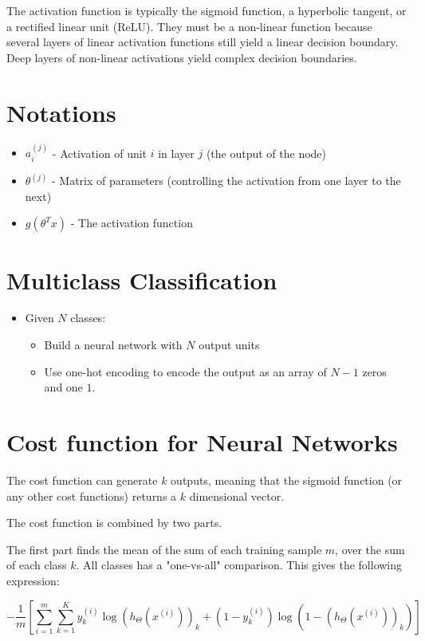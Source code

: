 The activation function is typically the sigmoid function, a hyperbolic tangent, 
or a rectified linear unit (ReLU). They must be a non-linear function because
several layers of linear activation functions still yield a linear decision 
boundary. Deep layers of non-linear activations yield complex decision
boundaries.

\section{Notations}
\begin{itemize}
    \item $a_i^{(j)}$ - Activation of unit $i$ in layer $j$ (the output of the node)
    \item $\theta^{(j)}$ - Matrix of parameters (controlling the activation from one layer to the next)
    \item $g(\theta^Tx)$ - The activation function
\end{itemize}

\section{Multiclass Classification}
\begin{itemize}
    \item Given $N$ classes:
    \begin{itemize}
        \item Build a neural network with $N$ output units
        \item Use one-hot encoding to encode the output as an array of $N-1$ zeros and one $1$.
    \end{itemize}
\end{itemize}

\section{Cost function for Neural Networks}
The cost function can generate $k$ outputs, meaning that the sigmoid function (or any other cost functions) returns a $k$ dimensional vector.

The cost function is combined by two parts.

\bigskip

The first part finds the mean of the sum of each training sample $m$, over the sum of each class $k$. All classes has a "one-vs-all" comparison. This gives the following expression:

\[
    -\frac{1}{m}\left[\sum_{i=1}^m\sum_{k=1}^Ky_k^{(i)} \log\left(h_\Theta(x^{(i)})\right)_k+(1-y_k^{(i)}) \log\left(1-(h_\Theta(x^{(i)}))_k\right)\right]
\]

